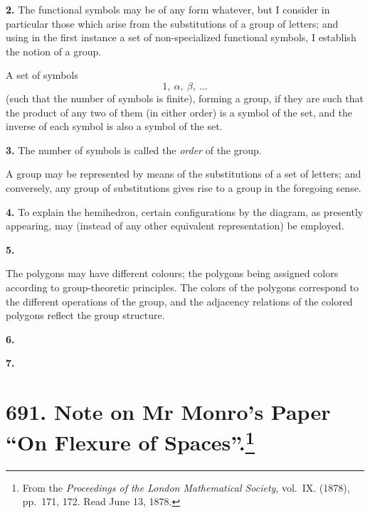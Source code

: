 \documentclass[11pt,a4paper]{book}
\begin{document}
\medskip
\noindent\textbf{2.}\quad
The functional symbols may be of any form whatever, but I consider in particular those which arise from the substitutions of a group of letters; and using in the first instance a set of non-specialized functional symbols, I establish the notion of a group.

A set of symbols
\[
1,\ \alpha,\ \beta,\ \dots
\]
(such that the number of symbols is finite), forming a group, if they are such that the product of any two of them (in either order) is a symbol of the set, and the inverse of each symbol is also a symbol of the set.

\medskip
\noindent\textbf{3.}\quad
The number of symbols is called the \textit{order} of the group.

A group may be represented by means of the substitutions of a set of letters; and conversely, any group of substitutions gives rise to a group in the foregoing sense.

\medskip
\noindent\textbf{4.}\quad
To explain the hemihedron, certain configurations by the diagram, as presently appearing, may (instead of any other equivalent representation) be employed.

\medskip
\noindent\textbf{5.}

The polygons may have different colours; the polygons being assigned colors according to group-theoretic principles. The colors of the polygons correspond to the different operations of the group, and the adjacency relations of the colored polygons reflect the group structure.

\medskip
\noindent\textbf{6.}

\medskip
\noindent\textbf{7.}

\newpage
\section[Note on Mr Monro's Paper ``On Flexure of Spaces'']{691. Note on Mr Monro's Paper ``On Flexure of Spaces''.\footnote{From the \textit{Proceedings of the London Mathematical Society}, vol.\ IX. (1878), pp.\ 171, 172. Read June 13, 1878.}}
\end{document}
